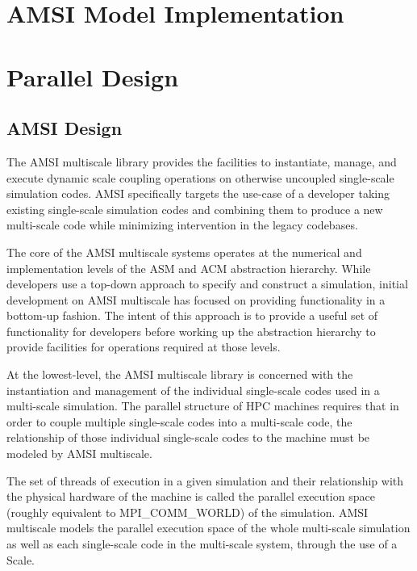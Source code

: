 \documentclass[review]{siamart1116}
\newcommand{\red}[1]{\textcolor{red}{[#1]}}
\begin{document}

\section{AMSI Model Implementation}\label{sec:amsi-mdl-impl}

\section{Parallel Design}\label{sec:amsi-par-design}

\subsection{AMSI Design}\label{sec:amsi-design}


The AMSI multiscale library provides the facilities to instantiate, manage, and execute dynamic scale coupling operations on otherwise uncoupled single-scale simulation codes. AMSI specifically targets the use-case of a developer taking existing single-scale simulation codes and combining them to produce a new multi-scale code while minimizing intervention in the legacy codebases.

The core of the AMSI multiscale systems operates at the numerical and implementation levels of the ASM and ACM abstraction hierarchy. While developers use a top-down approach to specify and construct a simulation, initial development on AMSI multiscale has focused on providing functionality in a bottom-up fashion. The intent of this approach is to provide a useful set of functionality for developers before working up the abstraction hierarchy to provide facilities for operations required at those levels.

At the lowest-level, the AMSI multiscale library is concerned with the instantiation and management of the individual single-scale codes used in a multi-scale simulation. The parallel structure of HPC machines requires that in order to couple multiple single-scale codes into a multi-scale code, the relationship of those individual single-scale codes to the machine must be modeled by AMSI multiscale. 

The set of threads of execution in a given simulation and their relationship with the physical hardware of the machine is called the parallel execution space (roughly equivalent to MPI\_COMM\_WORLD) of the simulation. AMSI multiscale models the parallel execution space of the whole multi-scale simulation as well as each single-scale code in the multi-scale system, through the use of a Scale.
\end{document}
